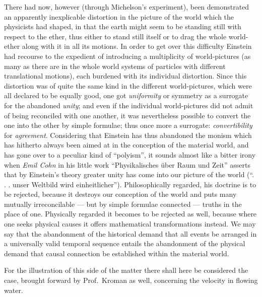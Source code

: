 \documentclass[12pt,a4paper]{article}
\begin{document}
There had now, however (through Michelson's experiment), been demonstrated an
apparently inexplicable distortion in the picture of the world which the
physicists had shaped, in that the earth might seem to be standing still with
respect to the ether, thus either to stand still itself or to drag the whole
world-ether along with it in all its motions. In order to get over this
difficulty Einstein had recourse to the expedient of introducing a multiplicity
of world-pictures (as many as there are in the whole world systems of
particles with different translational motions), each burdened with its
individual distortion. Since this distortion was of quite the same kind in the
different world-pictures, which were all declared to be equally good, one got
\emph{uniformity} or symmetry as a surrogate for the abandoned \emph{unity};
and even if the individual world-pictures did not admit of being reconciled
with one another, it was nevertheless possible to convert the one into the
other by simple formulae; thus once more a surrogate: \emph{convertibility}
for \emph{agreement}. Considering that Einstein has thus abandoned the monism
which has hitherto always been aimed at in the conception of the material
world, and has gone over to a peculiar kind of ``polyism'', it sounds almost
like a bitter irony when \emph{Emil Cohn} in his little work ``Physikalisches
über Raum und Zeit'' asserts that by Einstein's
theory greater unity has come into our picture of the world (``. . . unser
Weltbild wird einheitlicher''). Philosophically regarded, his doctrine is to
be rejected, because it destroys our conception of the world and puts many
mutually irreconcilable --- but by simple formulae connected --- truths in the
place of one. Physically regarded it becomes to be rejected as well, because
where one seeks physical causes it offers mathematical transformations
instead. We may say that the abandonment of the historical demand that all
events be arranged in a universally valid temporal sequence entails the
abandonment of the physical demand that causal connection be established
within the material world.

For the illustration of this side of the matter there shall here be considered
the case, brought forward by Prof.\ Kroman as well, concerning the velocity in
flowing water.
\end{document}
